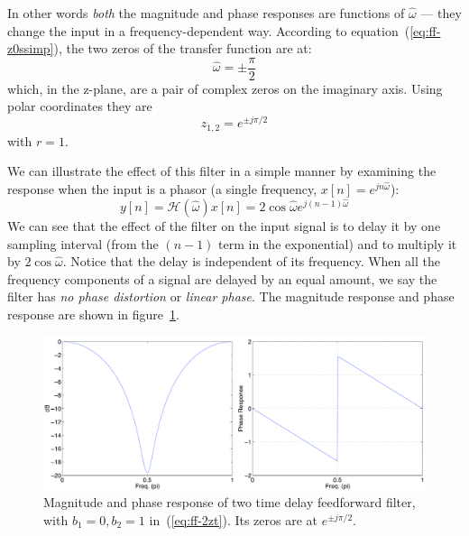 In other words \emph{both} the magnitude and phase responses are
functions of $\hat{\omega}$ --- they change the input in a
frequency-dependent way. According to equation~(\ref{eq:ff-z0ssimp}), the
two zeros of the transfer function are at:
\begin{equation*}
\hat{\omega}= \pm\frac{\pi}{2}
\end{equation*}
which, in the z-plane, are a pair of complex zeros on the imaginary axis. Using polar
coordinates they are
\begin{equation}
z_{1,2} = e^{\pm j\pi/2}
\end{equation}
with $r=1$. 

We can illustrate the effect of this filter in a simple manner by
examining the response when the input is a phasor (a single frequency,
$x[n]=e^{jn\hat{\omega}}$):
\begin{equation}
  y[n]= \mathcal{H}(\hat{\omega})x[n] 
      = 2\cos\hat{\omega} e^{j(n-1)\hat{\omega}} \label{eq:ff-2zt}
\end{equation}
We can see that the effect of the filter on the input signal is to
delay it by one sampling interval (from the $(n-1)$ term in the
exponential) and to multiply it by $2\cos\hat{\omega}$. Notice that
the delay is independent of its frequency. When all the frequency
components of a signal are delayed by an equal amount, we say the
filter has \emph{no phase distortion} or \emph{linear phase}. The
magnitude response and phase response are shown in
figure~\ref{fig:ff-exp2zh90-r1}.

\begin{figure}
\centerline{\includegraphics[width=6in]{ch-fir/ffexp_2tdelay_h90}}
\caption[Frequency response of two time delay feedforward
filter]{Magnitude and phase response of two time delay feedforward filter, with
$b_1=0, b_2=1$ in~(\protect\ref{eq:ff-2zt}).  Its zeros are at $e^{\pm
j\pi/2}$.
\label{fig:ff-exp2zh90-r1}}
\end{figure}

